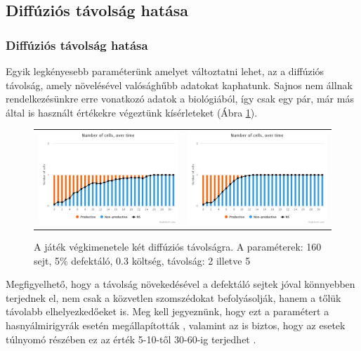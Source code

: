 \subsection{Diffúziós távolság hatása}
\begin{frame}
\frametitle{Diffúziós távolság hatása}
Egyik legkényesebb paraméterünk amelyet változtatni lehet, az a diffúziós távolság, amely növelésével valósághűbb adatokat kaphatunk. Sajnos nem állnak rendelkezésünkre erre vonatkozó adatok a biológiából, így csak egy pár, már más által is használt értékekre végeztünk kísérleteket (Ábra \ref{fig:DiffDist}).

\begin{figure}[h]
	\centering
	\begin{tabular}{cc}
		\includegraphics[width=0.47\linewidth]{images/diffdist2}
		&
		\includegraphics[width=0.47\linewidth]{images/diffdist5}
	\end{tabular}
	\caption{A játék végkimenetele két diffúziós távolságra. A paraméterek: 160 sejt, 5\% defektáló, 0.3 költség, távolság: 2 illetve 5}
	\label{fig:DiffDist}
\end{figure}

Megfigyelhető, hogy a távolság növekedésével a defektáló sejtek jóval könnyebben terjednek el, nem csak a közvetlen szomszédokat befolyásolják, hanem a tőlük távolabb elhelyezkedőeket is. Meg kell jegyeznünk, hogy ezt a paramétert a hasnyálmirigyrák esetén megállapították \cite{archetti2015heterogeneity}, valamint az is biztos, hogy az esetek túlnyomó részében ez az érték 5-10-től 30-60-ig terjedhet \cite{archetti2016cooperation}.
\end{frame}

